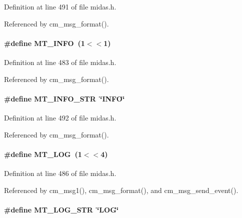 Definition at line 491 of file midas.h.

Referenced by cm\_\-msg\_\-format().
\paragraph[{MT\_\-INFO}]{\setlength{\rightskip}{0pt plus 5cm}\#define MT\_\-INFO~(1$<$$<$1)}\hfill\label{group__mdefineh_ga5bf211121ab25c5d13f8c2f272b9ca25}

\begin{DoxyItemize}
\item 
\end{DoxyItemize}

Definition at line 483 of file midas.h.

Referenced by cm\_\-msg\_\-format().
\paragraph[{MT\_\-INFO\_\-STR}]{\setlength{\rightskip}{0pt plus 5cm}\#define MT\_\-INFO\_\-STR~\char`\"{}INFO\char`\"{}}\hfill\label{group__mdefineh_ga52921072ed7363aa28460524cb2df62f}


Definition at line 492 of file midas.h.

Referenced by cm\_\-msg\_\-format().
\paragraph[{MT\_\-LOG}]{\setlength{\rightskip}{0pt plus 5cm}\#define MT\_\-LOG~(1$<$$<$4)}\hfill\label{group__mdefineh_gaa2290e1318f8605a3e59acf7112ba738}

\begin{DoxyItemize}
\item 
\end{DoxyItemize}

Definition at line 486 of file midas.h.

Referenced by cm\_\-msg1(), cm\_\-msg\_\-format(), and cm\_\-msg\_\-send\_\-event().
\paragraph[{MT\_\-LOG\_\-STR}]{\setlength{\rightskip}{0pt plus 5cm}\#define MT\_\-LOG\_\-STR~\char`\"{}LOG\char`\"{}}\hfill\label{group__mdefineh_ga14019e96c057b04851d5adb7d075d736}


